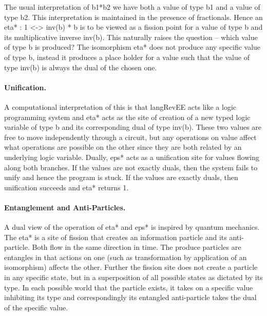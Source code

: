 \documentclass[preprint]{sigplanconf}
\begin{document}
The usual interpretation of {{b1*b2}} we have both a value of type
{{b1}} and a value of type {{b2}}. This interpretation is maintained
in the presence of fractionals. Hence an {{eta* : 1 <-> inv(b) * b}} is
to be viewed as a fission point for a value of type {{b}} and its
multiplicative inverse {{inv(b)}}. This naturally raises the question --
which value of type {{b}} is produced? The isomorphism {{eta*}} does
not produce any specific value of type {{b}}, instead it produces a
place holder for a value such that the value of type {{inv(b)}} is
always the dual of the chosen one. 

\begin{multicols}{2}
\begin{center}
\end{center}

\begin{center}
\end{center}  
\end{multicols}

\paragraph*{Unification.}
A computational interpretation of this is that {{langRevEE}} acts like
a logic programming system and {{eta*}} acts as the site of creation
of a new typed logic variable of type {{b}} and its corresponding dual
of type {{inv(b)}}. These two values are free to move independently
through a circuit, but any operations on value affect what operations
are possible on the other since they are both related by an underlying
logic variable. Dually, {{eps*}} acts as a unification site for values
flowing along both branches. If the values are not exactly duals, then
the system fails to unify and hence the program is stuck. If the
values are exactly duals, then unification succeeds and {{eta*}}
returns {{1}}.

\paragraph*{Entanglement and Anti-Particles.}
A dual view of the operation of {{eta*}} and {{eps*}} is inspired by
quantum mechanics. The {{eta*}} is a site of fission that creates an
information particle and its anti-particle. Both flow in the same
direction in time. The produce particles are entangles in that actions
on one (such as transformation by application of an isomorphism)
affects the other. Further the fission site does not create a particle
in any specific state, but in a superposition of all possible states
as dictated by its type. In each possible world that the particle
exists, it takes on a specific value inhibiting its type and
correspondingly its entangled anti-particle takes the dual of the
specific value.
\end{document}
